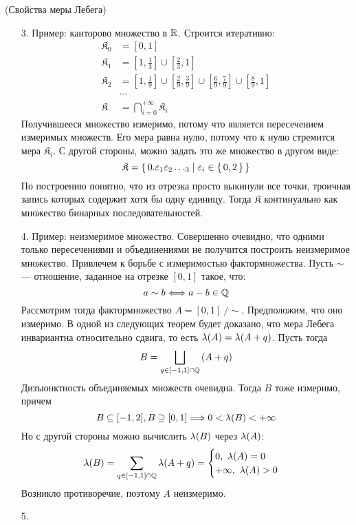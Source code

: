 \begin{theorem}(Свойства меры Лебега)
    \begin{itemize}
        \item[3.] Пример: канторово множество в $\mathbb{R}$. Строится итеративно:
\begin{align*}
	\mathfrak{K}_0 &= \left[0, 1\right] \\
	\mathfrak{K}_1 &= \left[1, \frac{1}{3}\right] \cup \left[\frac{2}{3}, 1\right]\\
	\mathfrak{K}_2 &= \left[1, \frac{1}{9}\right] \cup \left[\frac{2}{9}, \frac{3}{9}\right]
		\cup \left[\frac{6}{9}, \frac{7}{9}\right] \cup \left[\frac{8}{9}, 1\right]
			   \\	&\cdots \\
	\mathfrak{K} &= \bigcap_{i = 0}^{+\infty}{\mathfrak{K}_i}
\end{align*}
		Получившееся множество измеримо, потому что является пересечением измеримых 
		множеств. Его мера равна нулю, потому что к нулю стремится мера 
		$\mathfrak{K}_i$. С другой стороны, можно задать это же множество в другом виде:
\[
	\mathfrak{K} = \{\, 0.\varepsilon_1\varepsilon_2\ldots_3  \mid \varepsilon_i \in \{\,0,2\,\}  \,\}
\]
		По построению понятно, что из отрезка просто выкинули все точки, троичная запись 
		которых содержит хотя бы одну единицу. Тогда $\mathfrak{K}$ континуально 
		как множество бинарных последовательностей.
        \item[4.] Пример: неизмеримое множество. Совершенно очевидно, что одними 
			только пересечениями и объединениями не получится построить неизмеримое множество.
			Привлечем к борьбе с измеримостью фактормножества. Пусть $\sim$ --- отношение, 
			заданное на отрезке $[0, 1]$ такое, что:
\[
	a \sim b \Longleftrightarrow a - b \in \mathbb{Q}
\]
		Рассмотрим тогда фактормножество $A = [0, 1] ~/ \sim$. Предположим, что оно 
		измеримо. В одной из следующих теорем будет доказано, что мера Лебега инвариантна 
		относительно сдвига, то есть $\lambda(A) = \lambda(A + q)$. Пусть тогда
\[
	B = \bigsqcup_{q \in [-1, 1] \cap \mathbb{Q}}{\left(A + q\right)}
\]
		Дизъюнктность объединяемых множеств очевидна. Тогда $B$ тоже измеримо, причем
\[
	B \subseteq [-1, 2], B \supseteq [0, 1] \Longrightarrow 0 < \lambda(B) < +\infty
\]
		Но с другой стороны можно вычислить $\lambda(B)$ через $\lambda(A)$:
\[
	\lambda(B) = \sum_{q \in [-1, 1] \cap \mathbb{Q}}{\lambda(A + q)} = \begin{cases}
		0,~ \lambda(A) = 0 \\
		+\infty,~ \lambda(A) > 0
	\end{cases}
\]
		Возникло противоречие, поэтому $A$ неизмеримо.
	    \item[5.] \begin{itemize}

\end{itemize}
\end{itemize}
\end{theorem}
